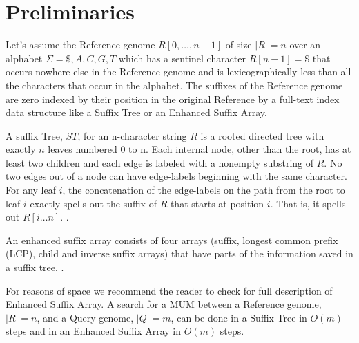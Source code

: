 \documentclass[runningheads,a4paper]{llncs}
\begin{document}
\section{Preliminaries}
Let's assume the Reference genome $R[0,\ldots, n-1]$ of size $|R|=n$ over an alphabet $\Sigma={ \$, A, C, G, T}$ which has a sentinel character $R[n-1] = \$$ that occurs nowhere else in the Reference genome and is lexicographically less than all the characters that occur in the alphabet. The suffixes of the Reference genome are zero indexed by their position in the original Reference by a full-text index data structure like a Suffix Tree or an Enhanced Suffix Array. 
\begin{definition}
A suffix Tree, $ST$, for an n-character string $R$ is a rooted directed tree with exactly $n$ leaves numbered 0 to n. Each internal node, other than the root, has at least two children and each edge is labeled with a nonempty substring of $R$. No two edges out of a node can have edge-labels beginning with the same character. For any leaf $i$, the concatenation of the edge-labels on the path from the root to leaf $i$ exactly spells out the suffix of $R$ that starts at position $i$. That is, it spells out $R[i\ldots n]$. \cite{Gusfield1997}.
\end{definition}
\begin{definition}
  An enhanced suffix array consists of four arrays (suffix, longest common prefix (LCP), child and inverse suffix arrays) that have parts of the information saved in a suffix tree. \cite{Abouelhoda2004}.
\end{definition}
For reasons of space we recommend the reader to check \cite{Abouelhoda2004} for full description of Enhanced Suffix Array.
A search for a MUM between a Reference genome, $|R|=n$, and a Query genome, $|Q|=m$,  can be done in a Suffix Tree in $O(m)$ steps and in an Enhanced Suffix Array in $O(m)$ steps.
\end{document}
